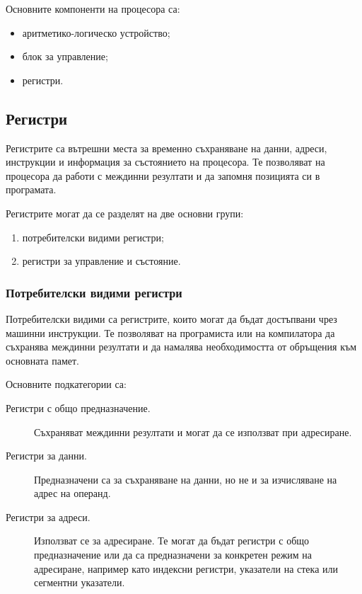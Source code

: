Основните компоненти на процесора са:

\begin{itemize}
    \item аритметико-логическо устройство;
    \item блок за управление;
    \item регистри.
\end{itemize}

\subsection{Регистри}\label{s:9.3.1}

\begin{defn}[Регистър]
Регистрите са вътрешни места за временно съхраняване на данни, адреси, инструкции и информация за състоянието на процесора. Те позволяват на процесора да работи с междинни резултати и да запомня позицията си в програмата.
\end{defn}

Регистрите могат да се разделят на две основни групи:

\begin{enumerate}
    \item потребителски видими регистри;
    \item регистри за управление и състояние.
\end{enumerate}

\subsubsection{Потребителски видими регистри}

\begin{defn}
Потребителски видими са регистрите, които могат да бъдат достъпвани чрез машинни инструкции. Те позволяват на програмиста или на компилатора да съхранява междинни резултати и да намалява необходимостта от обръщения към основната памет.
\end{defn}

Основните подкатегории са:

\begin{description}
    \item[Регистри с общо предназначение.] Съхраняват междинни резултати и могат да се използват при адресиране.
    \item[Регистри за данни.] Предназначени са за съхраняване на данни, но не и за изчисляване на адрес на операнд.
    \item[Регистри за адреси.] Използват се за адресиране. Те могат да бъдат регистри с общо предназначение или да са предназначени за конкретен режим на адресиране, например като индексни регистри, указатели на стека или сегментни указатели.
\end{description}

